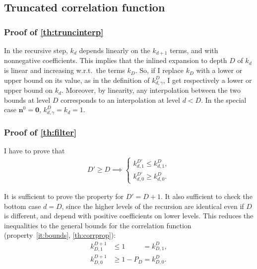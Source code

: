 \documentclass[a4paper]{article}
\theoremstyle{definition}
\let\oldmarginpar\marginpar
\renewcommand{\marginpar}[1]{\oldmarginpar{\sffamily\scriptsize #1}}
\renewcommand{\marginpar}[1]{\relax} %
\begin{document}
    \subsection{Truncated correlation function}
    \label{sec:truncproof}
    
    \subsubsection{Proof of \autoref{th:truncinterp}}

    In the recursive step, $k_d$ depends linearly on the $k_{d+1}$ terms, and with nonnegative coefficients. This implies that the inlined expansion to depth $D$ of $k_d$ is linear and increasing w.r.t.\ the terms $k_D$. So, if I replace $k_D$ with a lower or upper bound on its value, as in the definition of $k^D_{d,\gamma}$, I get respectively a lower or upper bound on $k_d$. Moreover, by linearity, any interpolation between the two bounds at level $D$ corresponds to an interpolation at level $d < D$. In the special case $\mathbf n^0=\mathbf 0$, $k^D_{d,\gamma}=k_d=1$.

    \subsubsection{Proof of \autoref{th:filter}}
    
    I have to prove that \marginpar{Necessary and sufficient
    conditions under which these inequalities are strict? Sufficient I guess $P_d \in (0, 1)$, $\mathbf n^0 \ne \mathbf 0$.}
    \begin{align}
        D' \ge D \implies \begin{cases}
            k^{D'}_{d,1} \le k^D_{d,1}, \\
            k^{D'}_{d,0} \ge k^D_{d,0}.
        \end{cases}
    \end{align}
    
    It is sufficient to prove the property for $D' = D + 1$. It also sufficient
    to check the bottom case $d = D$, since the higher levels of the recursion
    are identical even if $D$ is different, and depend with positive
    coefficients on lower levels. This reduces the inequalities to the general
    bounds for the correlation function (property~\ref{it:bounds}, \autoref{th:corrprop}):
    \begin{align}
        k^{D+1}_{D,1} &\le 1 \phantom{{}-P_D}
        = k^D_{D,1}, \\
        k^{D+1}_{D,0} &\ge 1 - P_D = k^D_{D,0}.
    \end{align}
\end{document}
